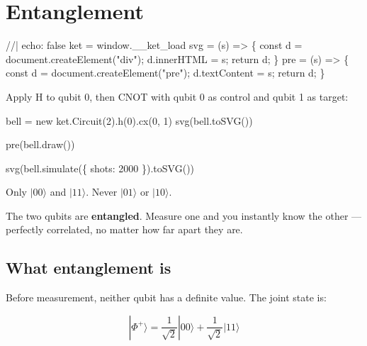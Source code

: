 \documentclass[
  11pt,
  letterpaper,
  oneside]{scrbook}
\newenvironment{Shaded}{\begin{snugshade}}{\end{snugshade}}
\newcommand{\NormalTok}[1]{\textcolor[rgb]{0.00,0.23,0.31}{#1}}
\begin{document}
\chapter{Entanglement}\label{sec-entanglement}

\begin{Shaded}
\begin{Highlighting}[]
\NormalTok{//| echo: false}
\NormalTok{ket = window.\_\_ket\_load}
\NormalTok{svg = (s) =\textgreater{} \{ const d = document.createElement("div"); d.innerHTML = s; return d; \}}
\NormalTok{pre = (s) =\textgreater{} \{ const d = document.createElement("pre"); d.textContent = s; return d; \}}
\end{Highlighting}
\end{Shaded}

Apply H to qubit 0, then CNOT with qubit 0 as control and qubit 1 as
target:

\begin{Shaded}
\begin{Highlighting}[]
\NormalTok{bell = new ket.Circuit(2).h(0).cx(0, 1)}
\NormalTok{svg(bell.toSVG())}
\end{Highlighting}
\end{Shaded}

\begin{Shaded}
\begin{Highlighting}[]
\NormalTok{pre(bell.draw())}
\end{Highlighting}
\end{Shaded}

\begin{Shaded}
\begin{Highlighting}[]
\NormalTok{svg(bell.simulate(\{ shots: 2000 \}).toSVG())}
\end{Highlighting}
\end{Shaded}

Only \(|00\rangle\) and \(|11\rangle\). Never \(|01\rangle\) or
\(|10\rangle\).

The two qubits are \textbf{entangled}. Measure one and you instantly
know the other --- perfectly correlated, no matter how far apart they
are.

\section{What entanglement is}\label{what-entanglement-is}

Before measurement, neither qubit has a definite value. The joint state
is:

\[|\Phi^+\rangle = \frac{1}{\sqrt{2}}|00\rangle + \frac{1}{\sqrt{2}}|11\rangle\]
\end{document}
